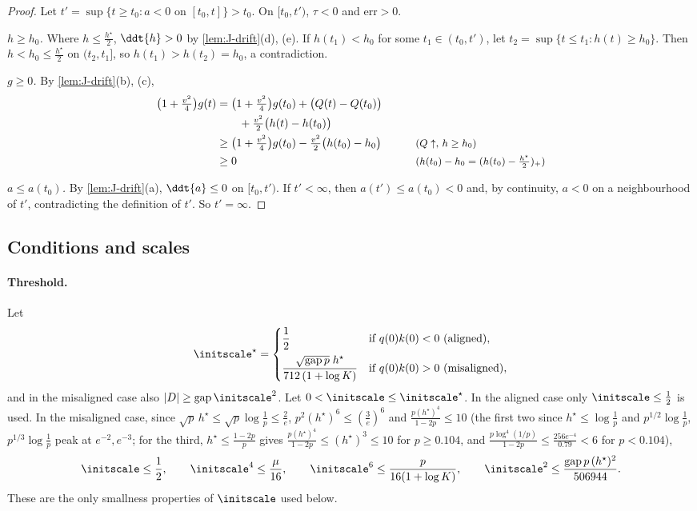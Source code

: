 \begin{proof}
Let $t'=\sup\{t\ge t_0:a<0\text{ on }[t_0,t]\}>t_0$. On $[t_0,t')$, $\tau<0$ and $\mathrm{err}>0$.

\emph{$h\ge h_0$.} Where $h\le\frac{h^\star}{2}$, $\ddt{h}>0$ by \cref{lem:J-drift}(d), (e). If $h(t_1)<h_0$ for some $t_1\in(t_0,t')$, let
$t_2=\sup\{t\le t_1:h(t)\ge h_0\}$. Then $h<h_0\le\frac{h^\star}{2}$ on $(t_2,t_1]$, so $h(t_1)>h(t_2)=h_0$, a contradiction.

\emph{$g\ge0$.} By \cref{lem:J-drift}(b), (c),
\begin{alignat*}{2}
 \bigl(1+\tfrac{v^2}{4}\bigr)g(t)&=\bigl(1+\tfrac{v^2}{4}\bigr)g(t_0)+\bigl(Q(t)-Q(t_0)\bigr) &\qquad&\\
 &\qquad+\tfrac{v^2}{2}\bigl(h(t)-h(t_0)\bigr)\\
 &\ge\bigl(1+\tfrac{v^2}{4}\bigr)g(t_0)-\tfrac{v^2}{2}\bigl(h(t_0)-h_0\bigr) && \text{\small($Q\uparrow$, $h\ge h_0$)}\\
 &\ge0 && \text{\small($h(t_0)-h_0=(h(t_0)-\tfrac{h^\star}{2})_+$)}
\end{alignat*}

\emph{$a\le a(t_0)$.} By \cref{lem:J-drift}(a), $\ddt{a}\le0$ on $[t_0,t')$. If $t'<\infty$, then $a(t')\le a(t_0)<0$ and, by continuity, $a<0$ on a
neighbourhood of $t'$, contradicting the definition of $t'$. So $t'=\infty$.
\end{proof}

\subsection{Conditions and scales}
\label{app:J-constants}

\paragraph{Threshold.} Let
\[
 \initscale^\star=\begin{cases}\dfrac{1}{2}&\text{if }q(0)k(0)<0\ \text{(aligned)},\\[8pt]
 \dfrac{\sqrt{\mathrm{gap}\,p}\;h^\star}{712\,(1+\log K)}&\text{if }q(0)k(0)>0\ \text{(misaligned)},\end{cases}
\]
and in the misaligned case also $|D|\ge\mathrm{gap}\,\initscale^2$. Let $0<\initscale\le\initscale^\star$. In the aligned case only $\initscale\le\frac{1}{2}$ is used.
In the misaligned case, since $\sqrt p\,h^\star\le\sqrt p\log\frac{1}{p}\le\frac{2}{e}$, $p^2(h^\star)^6\le(\frac{3}{e})^6$ and $\frac{p(h^\star)^4}{1-2p}\le10$
(the first two since $h^\star\le\log\frac1p$ and $p^{1/2}\log\frac1p$, $p^{1/3}\log\frac1p$ peak at $e^{-2},e^{-3}$; for the third,
$h^\star\le\frac{1-2p}{p}$ gives $\frac{p(h^\star)^4}{1-2p}\le(h^\star)^3\le10$ for $p\ge0.104$, and $\frac{p\log^4(1/p)}{1-2p}\le\frac{256e^{-4}}{0.79}<6$ for $p<0.104$),
\begin{equation}
 \initscale\le\frac{1}{2},\qquad \initscale^4\le\frac{\mu}{16},\qquad \initscale^6\le\frac{p}{16(1+\log K)},\qquad
 \initscale^2\le\frac{\mathrm{gap}\,p\,(h^\star)^2}{506944}.
 \label{eq:J-eps}
\end{equation}
These are the only smallness properties of $\initscale$ used below.

